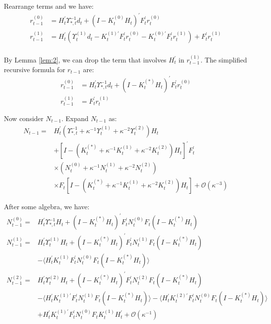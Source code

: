 \documentclass[10pt]{article}
\numberwithin{equation}{section}
\begin{document}
Rearrange terms and we have:
\begin{align*}
    r_{t-1}^{(0)} &= H_t^{'}\Upsilon_{*,t}^{-1}d_t + (I-K_{t}^{(0)}H_t)^{'}F_t^{'}r_t^{(0)} \\
    r_{t-1}^{(1)} &= H_t^{'}(\Upsilon_t^{(1)}d_t-K_t^{(1)'}F_t^{'}r_t^{(0)}-K_t^{(0)'}F_t^{'}r_t^{(1)})+F_t^{'}r_t^{(1)} \\
\end{align*}

By Lemma \ref{lem:2}, we can drop the term that involves $H_t^{'}$ in $r_{t-1}^{(1)}$. The simplified recursive formula for $r_{t-1}$ are:
\begin{align}
    r_{t-1}^{(0)} &= H_t^{'}\Upsilon_{*,t}^{-1}d_t + (I-K_{t}^{(*)}H_t)^{'}F_t^{'}r_t^{(0)} \label{eq:r_0_start} \\
    r_{t-1}^{(1)} &= F_t^{'}r_t^{(1)} \label{eq:r_0_end}
\end{align}

Now consider $N_{t-1}$. Expand $N_{t-1}$ as:
\begin{align*}
    N_{t-1} =& H_t^{'}(\Upsilon_{*,t}^{-1}+\kappa^{-1}\Upsilon_{t}^{(1)}+\kappa^{-2}\Upsilon_t^{(2)})H_t \\
    &+ [I-(K_t^{(*)}+\kappa^{-1}K_t^{(1)}+\kappa^{-2}K_t^{(2)})H_t]^{'}F_t^{'} \\
    &\times (N_t^{(0)}+\kappa^{-1}N_t^{(1)}+\kappa^{-2}N_t^{(2)}) \\
    &\times F_t[I-(K_t^{(*)}+\kappa^{-1}K_t^{(1)}+\kappa^{-2}K_t^{(2)})H_t]+\mathcal{O}(\kappa^{-3})
\end{align*}

After some algebra, we have:
\begin{align*}
    N_{t-1}^{(0)} =& H_t^{'}\Upsilon_{*,t}^{-1}H_t+(I-K_t^{(*)}H_t)^{'}F_t^{'}N_t^{(0)}F_t(I-K_t^{(*)}H_t) \\
    N_{t-1}^{(1)} =& H_t^{'}\Upsilon_t^{(1)}H_t + (I-K_t^{(*)}H_t)^{'}F_t^{'}N_t^{(1)}F_{t}(I-K_t^{(*)}H_t) \\
    &- \langle H_t^{'}K_t^{(1)}F_t^{'}N_t^{(0)}F_t(I-K_t^{(*)}H_t)\rangle \\
    N_{t-1}^{(2)} =& H_t^{'}\Upsilon_t^{(2)}H_t + (I-K_t^{(*)}H_t)^{'}F_t^{'}N_t^{(2)}F_t(I-K_t^{(*)}H_t) \\
    &- \langle H_t^{'}K_{t}^{(1)'}F_t^{'}N_t^{(1)}F_t(I-K_t^{(*)}H_t)\rangle -\langle H_t^{'}K_{t}^{(2)'}F_t^{'}N_t^{(0)}F_t(I-K_t^{(*)}H_t)\rangle \\
    &+ H_t^{'}K_t^{(1)'}F_t^{'}N_t^{(0)}F_tK_t^{(1)}H_t^{'} + \mathcal{O}(\kappa^{-1})
\end{align*}
\end{document}

